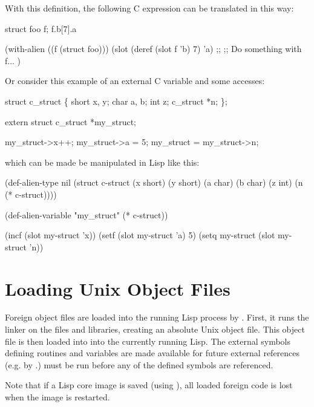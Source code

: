 With this definition, the following C expression can be translated in this way:

\begin{example}
struct foo f;
f.b[7].a

 \myequiv

(with-alien ((f (struct foo)))
  (slot (deref (slot f 'b) 7) 'a)
  ;;
  ;; Do something with f...
  )
\end{example}


Or consider this example of an external C variable and some accesses:

\begin{example}
struct c_struct \{
        short x, y;
        char a, b;
        int z;
        c_struct *n;
\};

extern struct c_struct *my_struct;

my_struct->x++;
my_struct->a = 5;
my_struct = my_struct->n;
\end{example}

which can be made be manipulated in Lisp like this:

\begin{lisp}
(def-alien-type nil
  (struct c-struct
          (x short)
          (y short)
          (a char)
          (b char)
          (z int)
          (n (* c-struct))))

(def-alien-variable "my_struct" (* c-struct))

(incf (slot my-struct 'x))
(setf (slot my-struct 'a) 5)
(setq my-struct (slot my-struct 'n))
\end{lisp}


\section{Loading Unix Object Files}

Foreign object files are loaded into the running Lisp process by
.  First, it runs the linker on the files and
libraries, creating an absolute Unix object file.  This object file is
then loaded into into the currently running Lisp.  The external
symbols defining routines and variables are made available for future
external references (e.g.  by .)
 must be run before any of the defined symbols are
referenced.

Note that if a Lisp core image is saved (using ), all
loaded foreign code is lost when the image is restarted.

